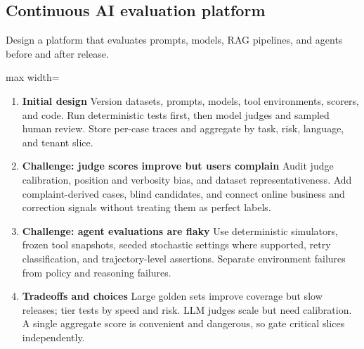\subsection{Continuous AI evaluation platform}
Design a platform that evaluates prompts, models, RAG pipelines, and agents before and after release.
\begin{center}\begin{adjustbox}{max width=\linewidth}\end{adjustbox}\end{center}
\begin{enumerate}
\item \textbf{Initial design} Version datasets, prompts, models, tool environments, scorers, and code. Run deterministic tests first, then model judges and sampled human review. Store per-case traces and aggregate by task, risk, language, and tenant slice.
\item \textbf{Challenge: judge scores improve but users complain} Audit judge calibration, position and verbosity bias, and dataset representativeness. Add complaint-derived cases, blind candidates, and connect online business and correction signals without treating them as perfect labels.
\item \textbf{Challenge: agent evaluations are flaky} Use deterministic simulators, frozen tool snapshots, seeded stochastic settings where supported, retry classification, and trajectory-level assertions. Separate environment failures from policy and reasoning failures.
\item \textbf{Tradeoffs and choices} Large golden sets improve coverage but slow releases; tier tests by speed and risk. LLM judges scale but need calibration. A single aggregate score is convenient and dangerous, so gate critical slices independently.
\end{enumerate}
